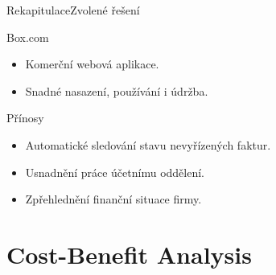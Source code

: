\documentclass[10pt]{beamer}
\begin{document}
\begin{frame}{Rekapitulace}{Zvolené řešení}	
	\begin{block}{Box.com}
		\begin{itemize}
			\item Komerční webová aplikace.
			\item Snadné nasazení, používání i údržba.
		\end{itemize}
	\end{block}
	
	\begin{block}{Přínosy}
		\begin{itemize}
			\item Automatické sledování stavu nevyřízených faktur.
			\item Usnadnění práce účetnímu oddělení.
			\item Zpřehlednění finanční situace firmy.
		\end{itemize}
	\end{block}
\end{frame}

\section[CBA]{Cost-Benefit Analysis}
\end{document}
